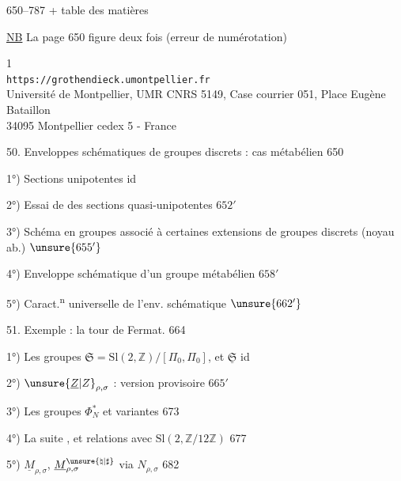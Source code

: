
 650--787 + table des matières

\uline{NB} La page 650 figure deux fois (erreur de numérotation)


\begin{center}
\small
1\\
\texttt{https://grothendieck.umontpellier.fr}\\
Université de Montpellier, UMR CNRS 5149, Case courrier 051, Place Eugène Bataillon\\
34095 Montpellier cedex 5 - France
\end{center}

50. Enveloppes schématiques de groupes discrets : cas métabélien \hfill 650

1°) Sections unipotentes \hfill id

2°) Essai de  des sections quasi-unipotentes \hfill $652'$

3°) Schéma en groupes associé à certaines extensions de groupes discrets (noyau ab.) \hfill $\unsure{655'}$

4°) Enveloppe schématique d'un groupe métabélien \hfill $658'$

5°) Caract.\textsuperscript{n} universelle de l'env. schématique \hfill $\unsure{662'}$

51. Exemple : la tour de Fermat. \hfill 664

1°) Les groupes $\mathfrak S=\mathrm{Sl}(2,\mathbb Z)/[\Pi_0,\Pi_0]$, et $\underline{\mathfrak S}$ \hfill id

2°) $\unsure{\underline Z|Z}_{\rho,\sigma}$ : version provisoire \hfill $665'$

3°) Les groupes $\Phi_N^*$ et variantes \hfill 673

4°) La suite
,
et relations avec $\mathrm{Sl}(2,\mathbb Z/12\mathbb Z)$ \hfill 677

5°) $\underline M_{\rho,\sigma}$, $\underline M^{\unsure{\natural|\sharp}}_{\rho,\sigma}$ via $N_{\rho,\sigma}$ \hfill 682


